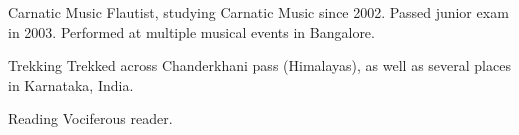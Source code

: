 	\begin{cvskills}

	\cvskill
	{Carnatic Music}
	{Flautist, studying Carnatic Music since 2002. Passed junior exam in 2003. Performed at multiple musical events in Bangalore.}

	\cvskill
	{Trekking}
	{Trekked across Chanderkhani pass (Himalayas), as well as several places in Karnataka, India.}

	\cvskill
	{Reading}
	{Vociferous reader.}

	\end{cvskills}
